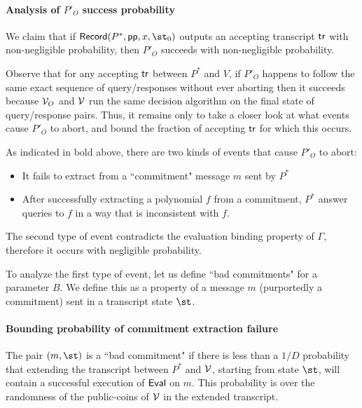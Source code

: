 \paragraph{Analysis of $P'_O$ success probability} 
We claim that if $\pro{Record}(P^*, \params, x, \st_0)$ outputs an accepting transcript $\textsf{{tr}}$ with non-negligible probability, then $P'_O$ succeeds with non-negligible probability. 

Observe that for any accepting $\textsf{{tr}}$ between $P^*$ and $V$, if $P'_O$ happens to follow the same exact sequence of query/responses without ever aborting then it succeeds because $\mathcal{V}_O$ and $\mathcal{V}$ run the same decision algorithm on the final state of query/response pairs. Thus, it remains only to take a closer look at what events cause $P'_O$ to abort, and bound the fraction of accepting $\textsf{{tr}}$ for which this occurs. 

As indicated in bold above, there are two kinds of events that cause $P'_O$ to abort: 
\begin{itemize}
\item It fails to extract from a ``commitment" message $m$ sent by $P^*$
\item After successfully extracting a polynomial $f$ from a commitment, $P^*$ answer queries to $f$ in a way that is inconsistent with $f$. 
\end{itemize}

The second type of event contradicts the evaluation binding property of $\Gamma$, therefore it occurs with negligible probability. 

To analyze the first type of event, let us define ``bad commitments" for a parameter $B$. We define this as a property of a message $m$ (purportedly a commitment) sent in a transcript state $\st$.

\paragraph{Bounding probability of commitment extraction failure} 
The pair $(m, \st)$ is a ``bad commitment" if there is less than a $1/D$ probability that extending the transcript between $P^*$ and $\mathcal{V}$, starting from state $\st$, will contain a successful execution of $\textsf{{Eval}}$ on $m$. This probability is over the randomness of the public-coins of $\mathcal{V}$ in the extended transcript. %



